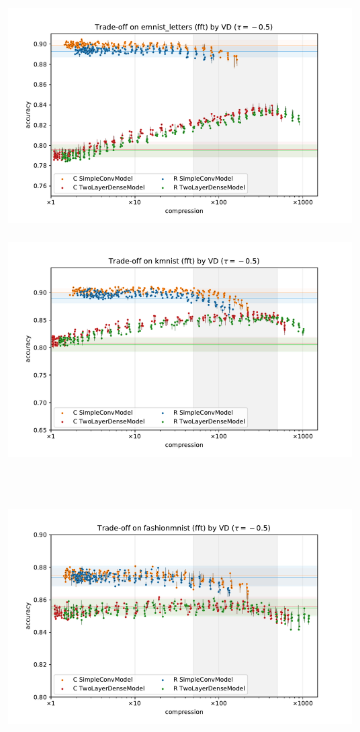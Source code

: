 \documentclass[a4paper,10pt]{article}
\begin{document}
\begin{figure}[b]
  \centering
  \begin{subfigure}[b]{0.5\textwidth}
    \centering
    \includegraphics[width=\linewidth]{figure__mnist-like__trade-off/appendix__VD__emnist_letters__fft__-0.5.pdf}
  \end{subfigure}%
  \begin{subfigure}[b]{0.5\textwidth}
    \centering
    \includegraphics[width=\linewidth]{figure__mnist-like__trade-off/appendix__VD__kmnist__fft__-0.5.pdf}
  \end{subfigure} \\ %
  \begin{subfigure}[b]{0.5\textwidth}
    \centering
    \includegraphics[width=\linewidth]{figure__mnist-like__trade-off/appendix__VD__fashionmnist__fft__-0.5.pdf}

\end{subfigure}
\end{figure}
\end{document}
